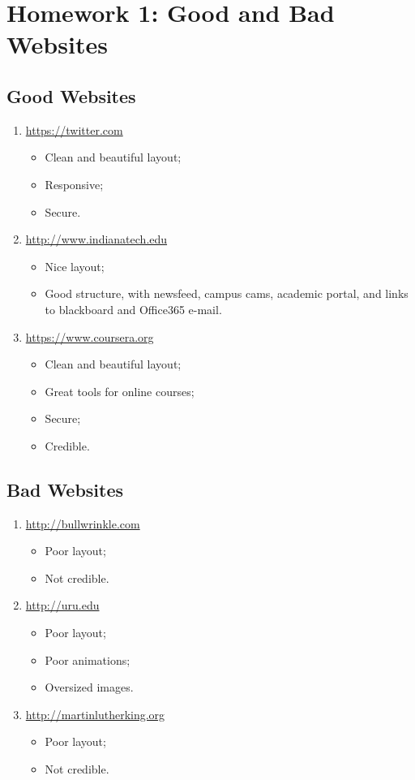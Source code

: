 \chapter{Homework 1: Good and Bad Websites}
	\section{Good Websites}
		\begin{enumerate}
			\item{\url{https://twitter.com}
				\begin{itemize}
					\item{Clean and beautiful layout;}
					\item{Responsive;}
					\item{Secure.}
				\end{itemize}}
			\item{\url{http://www.indianatech.edu}
				\begin{itemize}
					\item{Nice layout;}
					\item{Good structure, with newsfeed, campus cams, academic portal, and links to blackboard and Office365 e-mail.}
				\end{itemize}}
			\item{\url{https://www.coursera.org}
				\begin{itemize}
					\item{Clean and beautiful layout;}
					\item{Great tools for online courses;}
					\item{Secure;}
					\item{Credible.}
				\end{itemize}}
		\end{enumerate}

	\section{Bad Websites}
		\begin{enumerate}
			\item{\url{http://bullwrinkle.com}
				\begin{itemize}
					\item{Poor layout;}
					\item{Not credible.}
				\end{itemize}}
			\item{\url{http://uru.edu}
				\begin{itemize}
					\item{Poor layout;}
					\item{Poor animations;}
					\item{Oversized images.}
				\end{itemize}}
			\item{\url{http://martinlutherking.org}
				\begin{itemize}
					\item{Poor layout;}
					\item{Not credible.}
				\end{itemize}}
		\end{enumerate}

